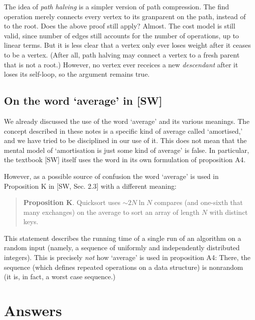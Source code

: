 \documentclass{tstextbook}
\begin{document}
\begin{ExerciseList}
  \Exercise{}
  The idea of \emph{path halving} is a simpler version of path compression. 
  The find operation merely connects every vertex to its granparent on the path, instead of to the root.
  Does the above proof still apply?
  \Answer{}
  Almost.
  The cost model is still valid, since number of edges still accounts for the number of operations, up to linear terms.
  But it is less clear that a vertex only ever loses weight after it ceases to be a vertex.
  (After all, path halving may connect a vertex to a fresh parent that is not a root.)
  However, no vertex ever receices a new \emph{descendant} after it loses its self-loop, so the argument remains true.
\end{ExerciseList}

\section{On the word `average' in [SW]}

We already discussed the use of the word `average' and its various meanings.
The concept described in these notes is a specific kind of average called `amortised,' and we have tried to be disciplined in our use of it.
This does not mean that the mental model of `amortisation is just some kind of average' is false.
In particular, the textbook [SW] itself uses the word in its own formulation of proposition A4.

However, as a possible source of confusion the word `average' is used in Proposition K in [SW, Sec. 2.3] with a different meaning:
\begin{quote}
  {\bf Proposition K}. Quicksort uses $\sim 2N\ln N$ compares (and one-sixth that many exchanges) on the average to sort an array of length $N$ with distinct keys.
\end{quote}
This statement describes the running time of a single run of an algorithm on a random input (namely, a sequence of uniformly and independently distributed integers).
This is precisely \emph{not} how `average' is used in proposition A4:
There, the sequence (which defines repeated operations on a data structure) is nonrandom (it is, in fact, a worst case sequence.)

\chapter{Answers}

\shipoutAnswer
\end{document}
